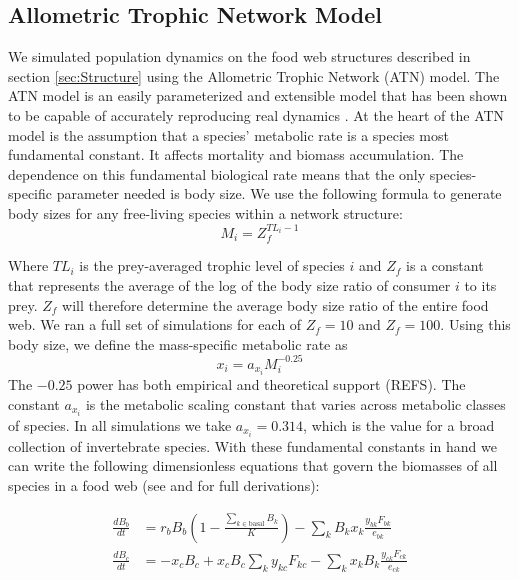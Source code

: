\documentclass[11pt]{amsart}
\begin{document}
\subsection{Allometric Trophic Network Model}

We simulated population dynamics on the food web structures described in section \ref{sec:Structure} using the Allometric Trophic Network (ATN) model.  The ATN model is an easily parameterized and extensible model that has been shown to be capable of accurately reproducing real dynamics \cite{Boit2012}.  At the heart of the ATN model is the assumption that a species' metabolic rate is a species most fundamental constant.  It affects mortality and biomass accumulation.  The dependence on this fundamental biological rate means that the only species-specific parameter needed is body size.  We use the following formula to generate body sizes for any free-living species within a network structure:
\begin{equation}
M_i= Z_f^{TL_i-1}\label{eq:MFree}
\end{equation}

Where $TL_i$ is the prey-averaged trophic level of species $i$ and $Z_f$ is a constant that represents the average of the log of the body size ratio of consumer $i$ to its prey.  $Z_f$ will therefore determine the average body size ratio of the entire food web.  We ran a full set of simulations for each of $Z_f = 10$ and $Z_f = 100$.  Using this body size, we define the mass-specific metabolic rate as
\begin{equation}
x_i = a_{x_i} M_i^{-0.25}\label{eq:x}
\end{equation}
The $-0.25$ power has both empirical and theoretical support (REFS).  The constant $a_{x_i}$ is the metabolic scaling constant that varies across metabolic classes of species.  In all simulations we take $a_{x_i}=0.314$, which is the value for a broad collection of invertebrate species.  With these fundamental constants in hand we can write the following dimensionless equations that govern the biomasses of all species in a food web (see \cite{Yodzis1992} and \cite{Willams2007} for full derivations): 

\begin{align}
\frac{dB_{b}}{dt} &= r_bB_b\left(1-\frac{\sum_{k\in\text{basal}}B_k}{K}\right) - \sum_kB_kx_k\frac{y_{bk}F_{bk}}{e_{bk}}\label{eq:basal0} \\ 
\frac{dB_{c}}{dt} &= -x_cB_c + x_cB_c\sum_ky_{kc}F_{kc} - \sum_k x_kB_k\frac{y_{ck}F_{ck}}{e_{ck}} \label{eq:con0}
\end{align}
\end{document}
